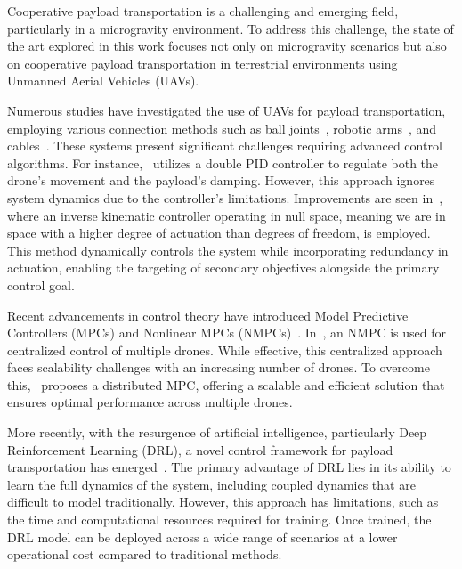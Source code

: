 Cooperative payload transportation is a challenging and emerging field, particularly in a microgravity environment. To address this challenge, the state of the art explored in this work focuses not only on microgravity scenarios but also on cooperative payload transportation in terrestrial environments using Unmanned Aerial Vehicles (UAVs).

Numerous studies have investigated the use of UAVs for payload transportation, employing various connection methods such as ball joints~\cite{tagliabue2019robust,loianno2018localization}, robotic arms~\cite{lee2020visual,ouyang2021control}, and cables~\cite{li2021design,klausen2018cooperative,li2023nonlinear}. These systems present significant challenges requiring advanced control algorithms. For instance,~\cite{dhiman2018cooperative} utilizes a double PID controller to regulate both the drone’s movement and the payload’s damping. However, this approach ignores system dynamics due to the controller's limitations. Improvements are seen in~\cite{gimenez2018multi}, where an inverse kinematic controller operating in null space, meaning we are in space with a higher degree of actuation than degrees of freedom, is employed. This method dynamically controls the system while incorporating redundancy in actuation, enabling the targeting of secondary objectives alongside the primary control goal.

Recent advancements in control theory have introduced Model Predictive Controllers (MPCs) and Nonlinear MPCs (NMPCs)~\cite{li2023nonlinear,9341541}. In~\cite{li2023nonlinear}, an NMPC is used for centralized control of multiple drones. While effective, this centralized approach faces scalability challenges with an increasing number of drones. To overcome this,~\cite{9341541} proposes a distributed MPC, offering a scalable and efficient solution that ensures optimal performance across multiple drones. 

More recently, with the resurgence of artificial intelligence, particularly Deep Reinforcement Learning (DRL), a novel control framework for payload transportation has emerged~\cite{panetsos2022deep,lin2023payload,9345959}. The primary advantage of DRL lies in its ability to learn the full dynamics of the system, including coupled dynamics that are difficult to model traditionally. However, this approach has limitations, such as the time and computational resources required for training. Once trained, the DRL model can be deployed across a wide range of scenarios at a lower operational cost compared to traditional methods.

